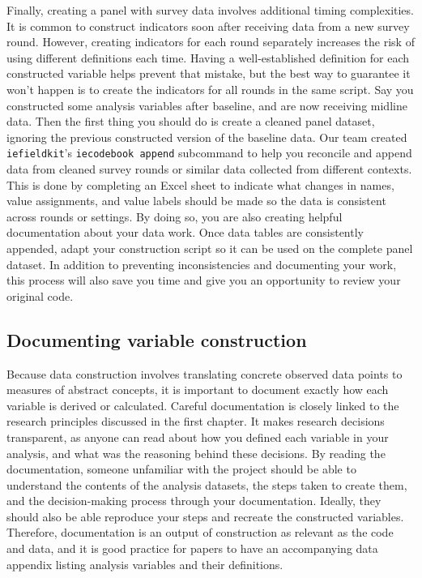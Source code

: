Finally, creating a panel with survey data involves additional timing complexities.
It is common to construct indicators soon after receiving data from a new survey round.
However, creating indicators for each round separately increases the risk of using different definitions each time.
Having a well-established definition for each constructed variable helps prevent that mistake,
but the best way to guarantee it won't happen is to create the indicators for all rounds in the same script.
Say you constructed some analysis variables after baseline, and are now receiving midline data.
Then the first thing you should do is create a cleaned panel dataset,
ignoring the previous constructed version of the baseline data.
Our team created \texttt{iefieldkit}'s \texttt{iecodebook append} subcommand
to help you reconcile and append data from cleaned survey rounds
or similar data collected from different contexts.
This is done by completing an Excel sheet to indicate what changes in
names, value assignments, and value labels should be made so the data is consistent across rounds or settings.
By doing so, you are also creating helpful documentation about your data work.
Once data tables are consistently appended,
adapt your construction script so it can be used on the complete panel dataset.
In addition to preventing inconsistencies and documenting your work,
this process will also save you time and give you an opportunity to review your original code.


\subsection{Documenting variable construction}

Because data construction involves translating concrete observed data points
to measures of abstract concepts,
it is important to document exactly how each variable is derived or calculated.
Careful documentation is closely linked to the research principles discussed in the first chapter.
It makes research decisions transparent,
as anyone can read about how you defined each variable in your analysis,
and what was the reasoning behind these decisions.
By reading the documentation,
someone unfamiliar with the project should be able to understand the contents of the analysis datasets,
the steps taken to create them, and the decision-making process through your documentation.
Ideally, they should also be able reproduce your steps and recreate the constructed variables.
Therefore, documentation is an output of construction as relevant as the code and data,
and it is good practice for papers to have an accompanying data appendix
listing analysis variables and their definitions.

